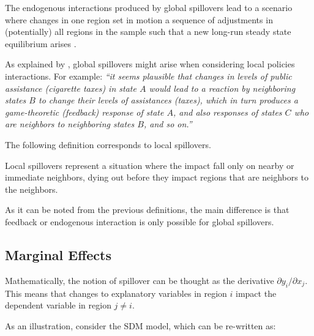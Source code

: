\documentclass[english,12pt]{book}\usepackage[]{graphicx}\usepackage[]{xcolor}
\begin{document}
The endogenous interactions produced by global spillovers lead to a scenario where changes in one region set in motion a sequence of adjustments in (potentially) all regions in the sample such that a new long-run steady state equilibrium arises \citep{lesage2014regional}.

As explained by \cite{lesage2014regional}, global spillovers might arise when considering local policies interactions. For example: \emph{``it seems plausible that changes in levels of public assistance (cigarette taxes) in state $A$ would lead to a reaction by neighboring states $B$ to change their levels of assistances (taxes), which in turn produces a game-theoretic (feedback) response of state $A$, and also responses of states $C$ who are neighbors to neighboring states $B$, and so on.''}


The following definition corresponds to local spillovers.

 \begin{definition}
 	Local spillovers represent a situation where the impact fall only on nearby or immediate neighbors, dying out before they impact regions that are neighbors to the neighbors.
 \end{definition}	

As it can be noted from the previous definitions, the main difference is that feedback or endogenous interaction is only possible for global spillovers. 



\subsection{Marginal Effects}

Mathematically, the notion of spillover can be thought as the derivative $\partial y_i/ \partial x_j$. This means that changes to explanatory variables in region $i$ impact the dependent variable in region $j\neq i$.

As an illustration, consider the SDM model, which can be re-written as:
\end{document}
